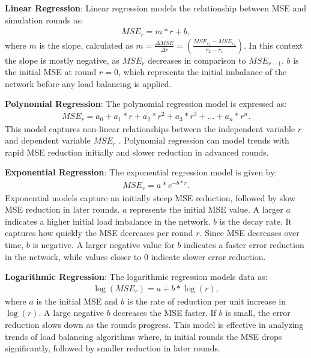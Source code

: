 \textbf{Linear Regression}: Linear regression models the relationship between MSE and simulation rounds as: 
\begin{align} \label{eq:linreg}
    MSE_r=m*r+b,    
\end{align}
where $m$ is the slope, calculated as $m=\frac{\Delta MSE}{\Delta r}=(\frac{MSE_{r_2}-MSE_{r_1}}{r_2 - r_1})$. In this context the slope is mostly negative, as $MSE_r$ decreases in comparison to $MSE_{r-1}$. $b$ is the initial MSE at round $r=0$, which represents the initial imbalance of the network before any load balancing is applied.

\textbf{Polynomial Regression}: The polynomial regression model is expressed as:
\begin{align} \label{eq:polyfit}
    MSE_r=a_0+a_1*r+a_2*r^{2}+a_3*r^{3}+...+a_n*r^{n}.    
\end{align}
This model captures non-linear relationships between the independent variable $r$ and dependent variable $MSE_r$ \cite{MotulskyDataFitting}. Polynomial regression can model trends with rapid MSE reduction initially and slower reduction in advanced rounds.

\textbf{Exponential Regression}: The exponential regression model is given by:
\begin{align}
    MSE_r=a*e^{-b*r}.
\end{align}
Exponential models capture an initially steep MSE reduction, followed by slow MSE reduction in later rounds. $a$ represents the initial MSE value. A larger $a$ indicates a higher initial load imbalance in the network. $b$ is the decay rate. It captures how quickly the MSE decreases per round $r$. Since MSE decreases over time, $b$ is negative. A larger negative value for $b$ indicates a faster error reduction in the network, while values closer to 0 indicate slower error reduction.

\textbf{Logarithmic Regression}: The logarithmic regression models data as:
\begin{align}
    \log{(MSE_r)}=a+b*\log{(r)},    
\end{align}
where $a$ is the initial MSE and $b$ is the rate of reduction per unit increase in $\log{(r)}$. A large negative $b$ decreases the MSE faster. If $b$ is small, the error reduction slows down as the rounds progress. This model is effective in analyzing trends of load balancing algorithms where, in initial rounds the MSE drops significantly, followed by smaller reduction in later rounds. \cite{libretexts2022}

